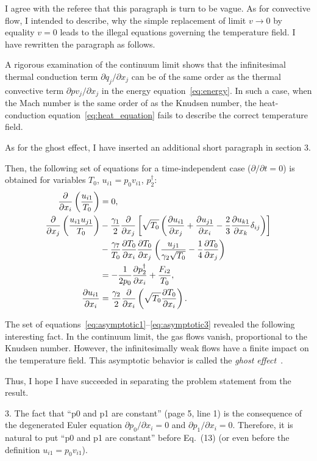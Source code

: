 \documentclass{article}
\newcommand{\pder}[2][]{\frac{\partial#1}{\partial#2}}
\newcommand{\Pder}[2][]{\partial#1/\partial#2}
\def\asterism{\par\vspace{1em}{\centering\scalebox{1}{\bfseries *~*~*}\par}\vspace{.5em}\par}
\begin{document}
I agree with the referee that this paragraph is turn to be vague.
As for convective flow, I intended to describe, why the simple replacement of limit \(v\to0\)
by equality \(v=0\) leads to the illegal equations governing the temperature field.
I have rewritten the paragraph as follows. 
\begin{leftbar}
A rigorous examination of the continuum limit shows that the infinitesimal thermal conduction term \(\Pder[q_j]{x_j}\)
can be of the same order as the thermal convective term \(\Pder[pv_j]{x_j}\) in the energy equation~\eqref{eq:energy}.
In such a case, when the Mach number is the same order of as the Knudsen number,
the heat-conduction equation~\eqref{eq:heat_equation} fails to describe
the correct temperature field.
\end{leftbar}
As for the ghost effect, I have inserted an additional short paragraph in section 3.
\begin{leftbar}
Then, the following set of equations for a time-independent case (\(\Pder{t} = 0\))
is obtained for variables \(T_0\), \(u_{i1} = p_0v_{i1}\), \(p_2^\dag\):
\begin{align}
	\pder{x_i}\left(\frac{u_{i1}}{T_0}\right) &= 0, \label{eq:asymptotic1} \\
	\pder{x_j}\left(\frac{u_{i1}u_{j1}}{T_0}\right)
		&-\frac{\gamma_1}2\pder{x_j}\left[\sqrt{T_0}\left(
			\pder[u_{i1}]{x_j}+\pder[u_{j1}]{x_i}-\frac23\pder[u_{k1}]{x_k}\delta_{ij}\right
		)\right] \notag\\
		&- \frac{\gamma_7}{T_0}\pder[T_0]{x_i}\pder[T_0]{x_j}\left(\frac{u_{j1}}{\gamma_2\sqrt{T_0}} - \frac{1}4\pder[T_0]{x_j}\right) \notag\\
		&= -\frac1{2p_0}\pder[p_2^\dag]{x_i} + \frac{F_{i2}}{T_0}, \label{eq:asymptotic2} \\
	\pder[u_{i1}]{x_i} &= \frac{\gamma_2}2\pder{x_i}\left(\sqrt{T_0}\pder[T_0]{x_i}\right). \label{eq:asymptotic3}
\end{align}
\asterism
The set of equations~\eqref{eq:asymptotic1}--\eqref{eq:asymptotic3} revealed the following interesting fact.
In the continuum limit, the gas flows vanish, proportional to the Knudsen number.
However, the infinitesimally weak flows have a finite impact on the temperature field.
This asymptotic behavior is called the \emph{ghost effect}~\cite{GhostEffect, Sone2002, Sone2007}.
\end{leftbar}
Thus, I hope I have succeeded in separating the problem statement from the result.

\begin{quoting}
3. The fact that ``p0 and p1 are constant'' (page 5, line 1) is the
consequence of the degenerated Euler equation \(\Pder[p_0]{x_i} = 0\) and
\(\Pder[p_1]{x_i} = 0\). Therefore, it is natural to put ``p0 and p1 are constant'' before
Eq.~(13) (or even before the definition \(u_{i1} = p_0v_{i1}\)).
\end{quoting}
\end{document}
